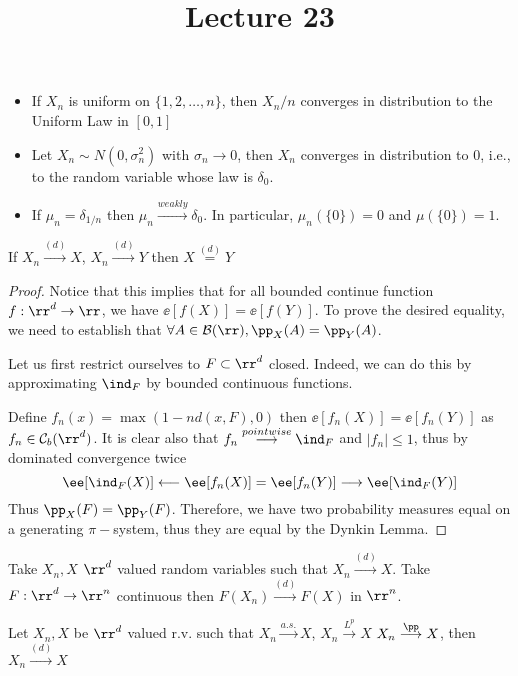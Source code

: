 \documentclass[../main.tex]{subfiles}
\title{Lecture 23}
\begin{document}
\begin{example}
    \hfill
    \begin{itemize}
      \item If $X_n$ is uniform on $\{ 1,2,\ldots, n \} $, then $X_n / n$ converges
        in distribution to the Uniform Law in $[0, 1]$
      \item Let $X_n \sim N(0, \sigma_n^2)$ with $\sigma_n \to 0$, then $X_n$
        converges in distribution to $0$, i.e., to the random variable whose law
        is $\delta_0$.
      \item If $\mu_n = \delta_{1/n}$ then $\mu_n
        \overset{weakly}{\longrightarrow} \delta_0$. In particular, $\mu_n(\{ 0
        \} ) = 0$ and $\mu(\{ 0 \} ) = 1$.
    \end{itemize}
\end{example}

\begin{lemma}
    If $X_n \overset{(d)}{\longrightarrow} X$, $X_n
    \overset{(d)}{\longrightarrow} Y$ then $X \overset{(d)}{=} Y$
\end{lemma} 
\begin{proof}
    Notice that this implies that for all bounded continue function $f: \rr^d
    \to \rr$, we have $\ee[f(X)] = \ee[f(Y)]$. To prove the desired equality, we
    need to establish that $\forall A \in \mathcal{B}(\rr), \pp_X(A) =
    \pp_Y(A)$.

    Let us first restrict ourselves to $F \subset \rr^d$ closed. Indeed, we can
    do this by approximating $\ind_F$ by bounded continuous functions.

    Define $f_n(x) = \max(1 - nd(x, F), 0)$ then $\ee[f_n(X)] = \ee[f_n(Y)]$ as
    $f_n \in \mathcal{C}_b (\rr^d)$. It is clear also that $f_n
    \overset{pointwise}{\longrightarrow} \ind_F$ and $|f_n| \leq 1$, thus by
    dominated convergence twice
    $$
    \ee[\ind_F(X)] \longleftarrow \ee[f_n(X)] = \ee[f_n(Y)] \longrightarrow
    \ee[\ind_F(Y)]
    $$
    Thus $\pp_X(F) = \pp_Y(F)$. Therefore, we have two probability measures
    equal on a generating $\pi-$system, thus they are equal by the Dynkin Lemma.
\end{proof}
\begin{proposition}
  Take $X_n, X$ $\rr^d$ valued random variables such that $X_n
  \overset{(d)}{\longrightarrow} X$. Take $F: \rr^d \to \rr^n$ continuous then
  $F(X_n) \overset{(d)}{\longrightarrow} F(X)$ in $\rr^n$.
\end{proposition}
\begin{proposition}
    Let $X_n, X$ be $\rr^d$ valued r.v. such that $X_n
    \overset{a.s.}{\longrightarrow} X$, $X_n\overset{L^p}{\longrightarrow}X$ $X_n \overset{\pp}{\longrightarrow}
    X$, then $X_n \overset{(d)}{\longrightarrow} X$
\end{proposition}
\end{document}
